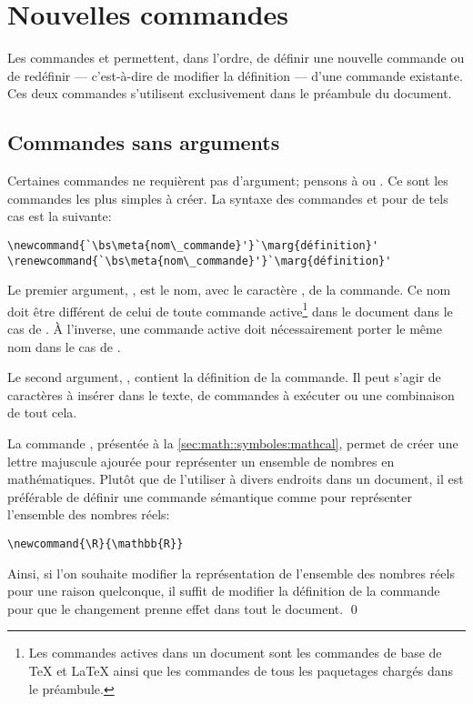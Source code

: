 \section{Nouvelles commandes}
\label{sec:commandes:commandes}

Les commandes \cmd{\newcommand} et \cmd{\renewcommand} permettent,
dans l'ordre, de définir une nouvelle commande ou de redéfinir ---
c'est-à-dire de modifier la définition --- d'une commande existante.
Ces deux commandes s'utilisent exclusivement dans le préambule du
document.

\subsection{Commandes sans arguments}
\label{sec:commandes:commandes:sans_arg}

Certaines commandes ne requièrent pas d'argument; pensons à
\cmdprint{\LaTeX} ou \cmdprint{\bfseries}. Ce sont les commandes les
plus simples à créer. La syntaxe des commandes \cmd{\newcommand} et
\cmd{\renewcommand} pour de tels cas est la suivante:
\begin{lstlisting}
\newcommand{`\bs\meta{nom\_commande}'}`\marg{définition}'
\renewcommand{`\bs\meta{nom\_commande}'}`\marg{définition}'
\end{lstlisting}
Le premier argument, \bs{}, est le nom, avec le
caractère \bs, de la commande. Ce nom doit être différent de celui de
toute commande active\footnote{%
  Les commandes actives dans un document sont les commandes de base de
  {\TeX} et {\LaTeX} ainsi que les commandes de tous les paquetages
  chargés dans le préambule.} %
dans le document dans le cas de \cmdprint{\newcommand}. À l'inverse,
une commande active doit nécessairement porter le même nom dans le cas
de \cmdprint{\renewcommand}.

Le second argument, , contient la définition de la
commande. Il peut s'agir de caractères à insérer dans le texte, de
commandes à exécuter ou une combinaison de tout cela.

\begin{exemple}
  La commande \cmd{\mathbb}, présentée à la
  \autoref{sec:math::symboles:mathcal}, permet de créer une lettre
  majuscule ajourée pour représenter un ensemble de nombres en
  mathématiques. Plutôt que de l'utiliser à divers endroits dans un
  document, il est préférable de définir une commande sémantique comme
  \cmdprint{\R} pour représenter l'ensemble des nombres réels:
\begin{lstlisting}
\newcommand{\R}{\mathbb{R}}
\end{lstlisting}
  Ainsi, si l'on souhaite modifier la représentation de l'ensemble des
  nombres réels pour une raison quelconque, il suffit de modifier la
  définition de la commande \cmdprint{\R} pour que le changement
  prenne effet dans tout le document. %
  \qed
\end{exemple}

